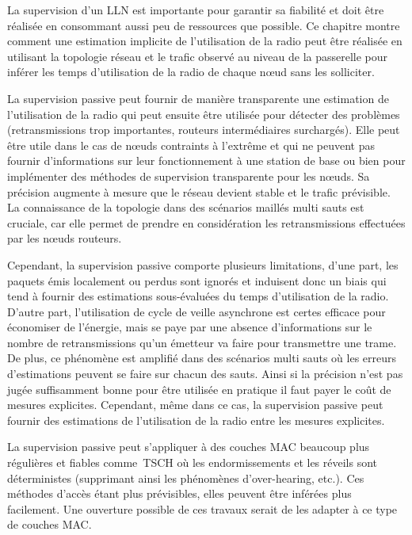 
La supervision d'un \ac{LLN} est importante pour garantir sa fiabilité et doit être réalisée en consommant aussi peu de ressources que possible.
Ce chapitre montre comment une estimation implicite de l'utilisation de la radio peut être réalisée en utilisant la topologie réseau et le trafic observé au niveau de la passerelle pour inférer les temps d'utilisation de la radio de chaque nœud sans les solliciter.


La supervision passive peut fournir de manière transparente une estimation de l'utilisation de la radio qui peut ensuite être utilisée pour détecter des problèmes (retransmissions trop importantes, routeurs intermédiaires surchargés).
Elle peut être utile dans le cas de nœuds contraints à l'extrême et qui ne peuvent pas fournir d'informations sur leur fonctionnement à une station de base ou bien pour implémenter des méthodes de supervision transparente pour les nœuds.
Sa précision augmente à mesure que le réseau devient stable et le trafic prévisible.
La connaissance de la topologie dans des scénarios maillés multi sauts est cruciale, car elle permet de prendre en considération les retransmissions effectuées par les nœuds routeurs.


Cependant, la supervision passive comporte plusieurs limitations, d'une part, les paquets émis localement ou perdus sont ignorés et induisent donc un biais qui tend à fournir des estimations sous-évaluées du temps d'utilisation de la radio.
D'autre part, l'utilisation de cycle de veille asynchrone est certes efficace pour économiser de l'énergie, mais se paye par une absence d'informations sur le nombre de retransmissions qu'un émetteur va faire pour transmettre une trame.
De plus, ce phénomène est amplifié dans des scénarios multi sauts où les erreurs d'estimations peuvent se faire sur chacun des sauts.
Ainsi si la précision n'est pas jugée suffisamment bonne pour être utilisée en pratique il faut payer le coût de mesures explicites.
Cependant, même dans ce cas, la supervision passive peut fournir des estimations de l'utilisation de la radio entre les mesures explicites.


La supervision passive peut s'appliquer à des couches \ac{MAC} beaucoup plus régulières et fiables comme~\ac{TSCH} où les endormissements et les réveils sont déterministes (supprimant ainsi les phénomènes d'over-hearing, etc.).
Ces méthodes d'accès étant plus prévisibles, elles peuvent être inférées plus facilement.
Une ouverture possible de ces travaux serait de les adapter à ce type de couches \ac{MAC}.

